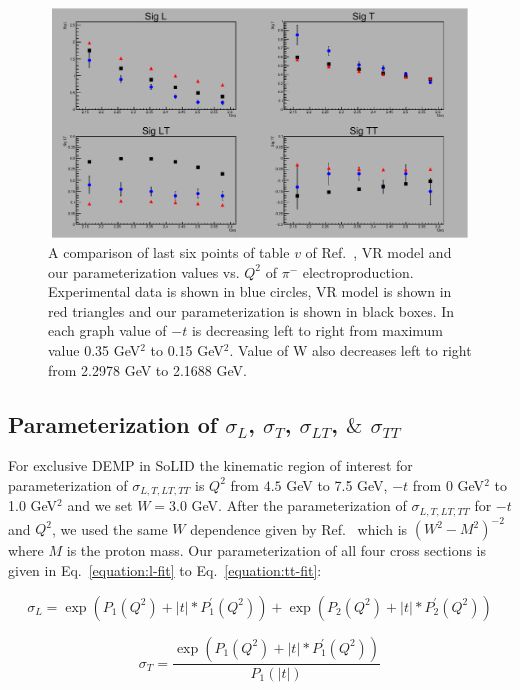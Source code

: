 \begin{figure}[!hbt]
    \centering
    \includegraphics[width=6.0in,height=2.4in]{./figures/pimsigma_qsq.pdf}
    \caption{ A comparison of last six points of table $v$ of
      Ref.~\cite{gmhuber-2}, VR model and our parameterization values
      vs. $Q^{2}$ of $\pi^{-}$ electroproduction. Experimental data is shown in
      blue circles, VR model is shown in red triangles and our parameterization
      is shown in black boxes. In each graph value of $-t$ is decreasing left
      to right from maximum value 0.35 GeV$^2$ to 0.15 GeV$^2$. Value of W also
      decreases left to right from 2.2978 GeV to 2.1688 GeV.}
    \label{fig:expvrfit}
\end{figure}

\subsection{Parameterization of $\sigma_{L}$, $\sigma_{T}$, $\sigma_{LT}$, $\&$ $\sigma_{TT}$}

For exclusive DEMP in SoLID the kinematic region of interest for
parameterization of $\sigma_{L,T,LT,TT}$ is $Q^2$ from $4.5$ GeV to 7.5 GeV,
$-t$ from 0 GeV$^2$ to 1.0 GeV$^2$ and we set $W = 3.0$ GeV. After the
parameterization of $\sigma_{L,T,LT,TT}$ for $-t$ and $Q^2$, we used the same
$W$ dependence given by Ref.~\cite{gmhuber} which is $(W^2-M^2)^{-2}$ where $M$
is the proton mass. Our parameterization of all four cross sections is given in
Eq.~\ref{equation:l-fit} to Eq.~\ref{equation:tt-fit}:

\begin{equation}
        \sigma_{L} = \exp{(P_1(Q^2) + |t| * P^{\prime}_1(Q^2))} +
        \exp{(P_2(Q^2) + |t| * P^{\prime}_2(Q^2))}
     \label{equation:l-fit}
\end{equation}

\begin{equation}
        \sigma_{T} = \frac{\exp{(P_1(Q^2) + |t| *
            P^{\prime}_1(Q^2))}}{P_{1}(|t|)}
     \label{equation:t-fit}
\end{equation}

